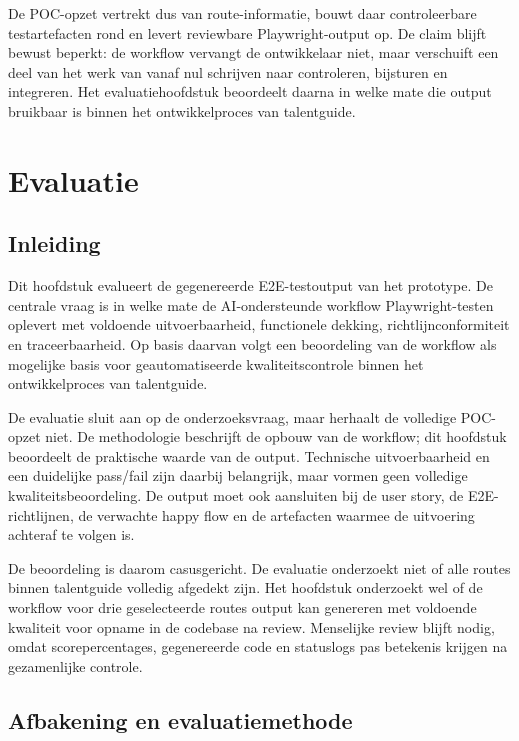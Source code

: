 De POC-opzet vertrekt dus van route-informatie, bouwt daar controleerbare testartefacten rond en levert reviewbare Playwright-output op. De claim blijft bewust beperkt: de workflow vervangt de ontwikkelaar niet, maar verschuift een deel van het werk van vanaf nul schrijven naar controleren, bijsturen en integreren. Het evaluatiehoofdstuk beoordeelt daarna in welke mate die output bruikbaar is binnen het ontwikkelproces van talentguide.

\chapter{Evaluatie}
\label{ch:fase4}

\section{Inleiding}

Dit hoofdstuk evalueert de gegenereerde E2E-testoutput van het prototype. De centrale vraag is in welke mate de AI-ondersteunde workflow Playwright-testen oplevert met voldoende uitvoerbaarheid, functionele dekking, richtlijnconformiteit en traceerbaarheid. Op basis daarvan volgt een beoordeling van de workflow als mogelijke basis voor geautomatiseerde kwaliteitscontrole binnen het ontwikkelproces van talentguide.

De evaluatie sluit aan op de onderzoeksvraag, maar herhaalt de volledige POC-opzet niet. De methodologie beschrijft de opbouw van de workflow; dit hoofdstuk beoordeelt de praktische waarde van de output. Technische uitvoerbaarheid en een duidelijke pass/fail zijn daarbij belangrijk, maar vormen geen volledige kwaliteitsbeoordeling. De output moet ook aansluiten bij de user story, de E2E-richtlijnen, de verwachte happy flow en de artefacten waarmee de uitvoering achteraf te volgen is.

De beoordeling is daarom casusgericht. De evaluatie onderzoekt niet of alle routes binnen talentguide volledig afgedekt zijn. Het hoofdstuk onderzoekt wel of de workflow voor drie geselecteerde routes output kan genereren met voldoende kwaliteit voor opname in de codebase na review. Menselijke review blijft nodig, omdat scorepercentages, gegenereerde code en statuslogs pas betekenis krijgen na gezamenlijke controle.

\section{Afbakening en evaluatiemethode}

